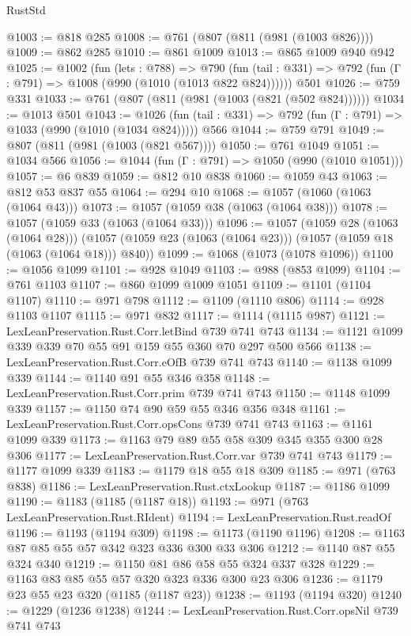 \begin{lexlean}{RustStd}
\begin{coremodule}
@1003 := @818 @285
@1008 := @761 (@807 (@811 (@981 (@1003 @826))))
@1009 := @862 @285
@1010 := @861 @1009
@1013 := @865 @1009 @940 @942
@1025 := @1002
    (fun (lets : @788) =>
    @790 (fun (tail : @331) => @792 (fun (Γ : @791) => @1008 (@990 (@1010 (@1013 @822 @824))))))
    @501
@1026 := @759 @331
@1033 := @761 (@807 (@811 (@981 (@1003 (@821 (@502 @824))))))
@1034 := @1013 @501
@1043 := @1026
    (fun (tail : @331) => @792 (fun (Γ : @791) => @1033 (@990 (@1010 (@1034 @824)))))
    @566
@1044 := @759 @791
@1049 := @807 (@811 (@981 (@1003 (@821 @567))))
@1050 := @761 @1049
@1051 := @1034 @566
@1056 := @1044 (fun (Γ : @791) => @1050 (@990 (@1010 @1051)))
@1057 := @6 @839
@1059 := @812 @10 @838
@1060 := @1059 @43
@1063 := @812 @53 @837 @55
@1064 := @294 @10
@1068 := @1057 (@1060 (@1063 (@1064 @43)))
@1073 := @1057 (@1059 @38 (@1063 (@1064 @38)))
@1078 := @1057 (@1059 @33 (@1063 (@1064 @33)))
@1096 := @1057
    (@1059 @28 (@1063 (@1064 @28)))
    (@1057 (@1059 @23 (@1063 (@1064 @23))) (@1057 (@1059 @18 (@1063 (@1064 @18))) @840))
@1099 := @1068 (@1073 (@1078 @1096))
@1100 := @1056 @1099
@1101 := @928 @1049
@1103 := @988 (@853 @1099)
@1104 := @761 @1103
@1107 := @860 @1099 @1009 @1051
@1109 := @1101 (@1104 @1107)
@1110 := @971 @798
@1112 := @1109 (@1110 @806)
@1114 := @928 @1103 @1107
@1115 := @971 @832
@1117 := @1114 (@1115 @987)
@1121 := LexLeanPreservation.Rust.Corr.letBind @739 @741 @743
@1134 := @1121 @1099 @339 @339 @70 @55 @91 @159 @55 @360 @70 @297 @500 @566
@1138 := LexLeanPreservation.Rust.Corr.eOfB @739 @741 @743
@1140 := @1138 @1099 @339
@1144 := @1140 @91 @55 @346 @358
@1148 := LexLeanPreservation.Rust.Corr.prim @739 @741 @743
@1150 := @1148 @1099 @339
@1157 := @1150 @74 @90 @59 @55 @346 @356 @348
@1161 := LexLeanPreservation.Rust.Corr.opsCons @739 @741 @743
@1163 := @1161 @1099 @339
@1173 := @1163 @79 @89 @55 @58 @309 @345 @355 @300 @28 @306
@1177 := LexLeanPreservation.Rust.Corr.var @739 @741 @743
@1179 := @1177 @1099 @339
@1183 := @1179 @18 @55 @18 @309
@1185 := @971 (@763 @838)
@1186 := LexLeanPreservation.Rust.ctxLookup
@1187 := @1186 @1099
@1190 := @1183 (@1185 (@1187 @18))
@1193 := @971 (@763 LexLeanPreservation.Rust.RIdent)
@1194 := LexLeanPreservation.Rust.readOf
@1196 := @1193 (@1194 @309)
@1198 := @1173 (@1190 @1196)
@1208 := @1163 @87 @85 @55 @57 @342 @323 @336 @300 @33 @306
@1212 := @1140 @87 @55 @324 @340
@1219 := @1150 @81 @86 @58 @55 @324 @337 @328
@1229 := @1163 @83 @85 @55 @57 @320 @323 @336 @300 @23 @306
@1236 := @1179 @23 @55 @23 @320 (@1185 (@1187 @23))
@1238 := @1193 (@1194 @320)
@1240 := @1229 (@1236 @1238)
@1244 := LexLeanPreservation.Rust.Corr.opsNil @739 @741 @743

\end{coremodule}
\end{lexlean}
